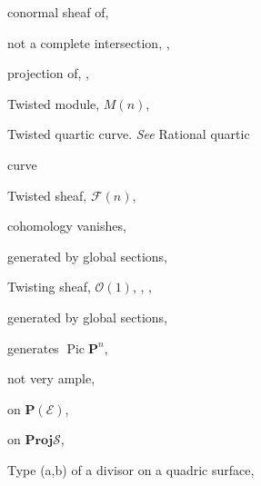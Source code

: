 {{\noindent\hspace*{7.5bp}conormal sheaf of, \par
\noindent\hspace*{7.5bp}not a complete intersection, , \par
\noindent\hspace*{7.5bp}projection of, , \par
\noindent\hspace*{0.0bp}Twisted module, $M(n)$, \par
\noindent\hspace*{0.0bp}Twisted quartic curve. \emph{See} Rational quartic\par
\noindent\hspace*{15.0bp}curve\par
\noindent\hspace*{0.0bp}Twisted sheaf, $\mathcal F(n)$, \par
\noindent\hspace*{7.5bp}cohomology vanishes, \par
\noindent\hspace*{7.5bp}generated by global sections, \par
\noindent\hspace*{0.0bp}Twisting sheaf, $\mathcal O(1)$, , , \par
\noindent\hspace*{7.5bp}generated by global sections, \par
\noindent\hspace*{7.5bp}generates $\operatorname{Pic}\mathbf P^n$, \par
\noindent\hspace*{7.5bp}not very ample, \par
\noindent\hspace*{7.5bp}on $\mathbf P(\mathcal E)$, \par
\noindent\hspace*{7.5bp}on $\mathbf{Proj}\mathcal S$, \par
\noindent\hspace*{0.0bp}Type (a,b) of a divisor on a quadric surface,\par
\noindent\hspace*{15.0bp}\par
}}
